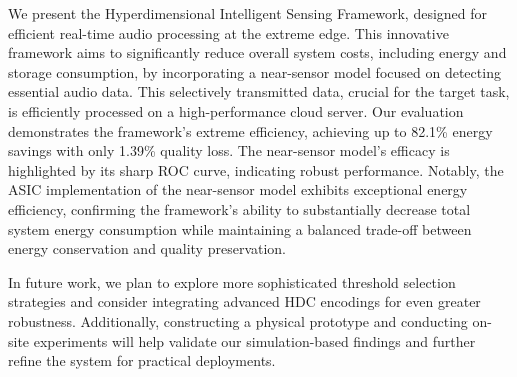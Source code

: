 
We present the Hyperdimensional Intelligent Sensing Framework, designed for efficient real-time audio processing at the extreme edge. This innovative framework aims to significantly reduce overall system costs, including energy and storage consumption, by incorporating a near-sensor model focused on detecting essential audio data. This selectively transmitted data, crucial for the target task, is efficiently processed on a high-performance cloud server. Our evaluation demonstrates the framework's extreme efficiency, achieving up to 82.1\% energy savings with only 1.39\% quality loss. The near-sensor model's efficacy is highlighted by its sharp ROC curve, indicating robust performance. Notably, the ASIC implementation of the near-sensor model exhibits exceptional energy efficiency, confirming the framework's ability to substantially decrease total system energy consumption while maintaining a balanced trade-off between energy conservation and quality preservation.

In future work, we plan to explore more sophisticated threshold selection strategies and consider integrating advanced HDC encodings for even greater robustness. Additionally, constructing a physical prototype and conducting on-site experiments will help validate our simulation-based findings and further refine the system for practical deployments.
